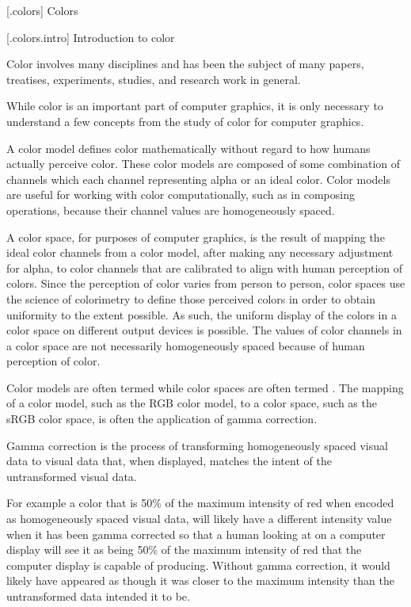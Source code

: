 
 [\iotwod.colors] {Colors}

 [\iotwod.colors.intro] {Introduction to color}

\pnum
Color involves many disciplines and has been the subject of many papers, treatises, experiments, studies, and research work in general.

\pnum
While color is an important part of computer graphics, it is only necessary to understand a few concepts from the study of color for computer graphics.

\pnum
A color model defines color mathematically without regard to how humans actually perceive color. These color models are composed of some combination of channels which each channel representing alpha or an ideal color. Color models are useful for working with color computationally, such as in composing operations, because their channel values are homogeneously spaced. 

\pnum
A color space, for purposes of computer graphics, is the result of mapping the ideal color channels from a color model, after making any necessary adjustment for alpha, to color channels that are calibrated to align with human perception of colors. Since the perception of color varies from person to person, color spaces use the science of colorimetry to define those perceived colors in order to obtain uniformity to the extent possible. As such, the uniform display of the colors in a color space on different output devices is possible. The values of color channels in a color space are not necessarily homogeneously spaced because of human perception of color.

\pnum
Color models are often termed  while color spaces are often termed . The mapping of a color model, such as the RGB color model, to a color space, such as the sRGB color space, is often the application of gamma correction.

\pnum
Gamma correction is the process of transforming homogeneously spaced visual data to visual data that, when displayed, matches the intent of the untransformed visual data.

\pnum
For example a color that is 50\% of the maximum intensity of red when encoded as homogeneously spaced visual data, will likely have a different intensity value when it has been gamma corrected so that a human looking at on a computer display will see it as being 50\% of the maximum intensity of red that the computer display is capable of producing. Without gamma correction, it would likely have appeared as though it was closer to the maximum intensity than the untransformed data intended it to be.

